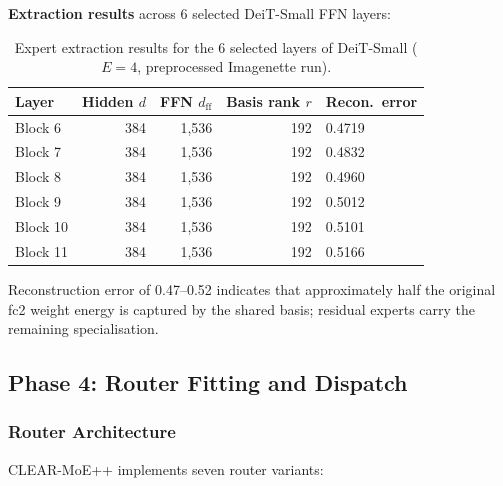 \documentclass[12pt,a4paper]{article}
\begin{document}
\textbf{Extraction results} across 6 selected DeiT-Small FFN layers:

\begin{table}[H]
\centering
\caption{Expert extraction results for the 6 selected layers of DeiT-Small ($E=4$, preprocessed Imagenette run).}
\label{tab:extraction}
\begin{tabular}{lrrrl}
\toprule
\textbf{Layer} & \textbf{Hidden $d$} & \textbf{FFN $d_\text{ff}$} & \textbf{Basis rank $r$} & \textbf{Recon.\ error} \\
\midrule
Block 6  & 384 & 1,536 & 192 & 0.4719 \\
Block 7  & 384 & 1,536 & 192 & 0.4832 \\
Block 8  & 384 & 1,536 & 192 & 0.4960 \\
Block 9  & 384 & 1,536 & 192 & 0.5012 \\
Block 10 & 384 & 1,536 & 192 & 0.5101 \\
Block 11 & 384 & 1,536 & 192 & 0.5166 \\
\bottomrule
\end{tabular}
\end{table}

Reconstruction error of 0.47--0.52 indicates that approximately half the original fc2 weight energy is captured by the shared basis; residual experts carry the remaining specialisation.

\subsection{Phase 4: Router Fitting and Dispatch}

\subsubsection{Router Architecture}

CLEAR-MoE++ implements seven router variants:
\end{document}
